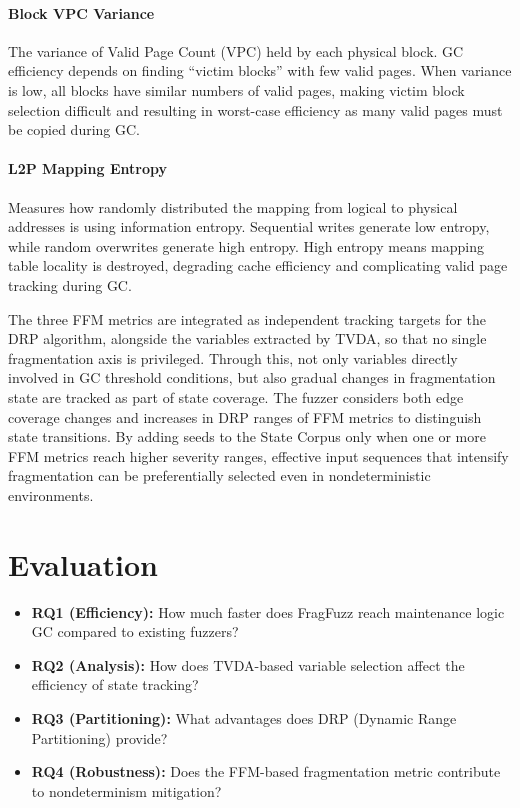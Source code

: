 \documentclass[conference]{IEEEtran}
\begin{document}
 \paragraph{Block VPC Variance}
The variance of Valid Page Count (VPC) held by each physical block.
GC efficiency depends on finding ``victim blocks'' with few valid pages.
When variance is low, all blocks have similar numbers of valid pages, making victim block selection difficult and resulting in worst-case efficiency as many valid pages must be copied during GC.
 \paragraph{L2P Mapping Entropy}
Measures how randomly distributed the mapping from logical to physical addresses is using information entropy.
Sequential writes generate low entropy, while random overwrites generate high entropy.
High entropy means mapping table locality is destroyed, degrading cache efficiency and complicating valid page tracking during GC.

The three FFM metrics are integrated as independent tracking targets for the DRP algorithm, alongside the variables extracted by TVDA, so that no single fragmentation axis is privileged.
Through this, not only variables directly involved in GC threshold conditions, but also gradual changes in fragmentation state are tracked as part of state coverage.
The fuzzer considers both edge coverage changes and increases in DRP ranges of FFM metrics to distinguish state transitions.
By adding seeds to the State Corpus only when one or more FFM metrics reach higher severity ranges, effective input sequences that intensify fragmentation can be preferentially selected even in nondeterministic environments.

\section{Evaluation}
\begin{itemize}
    \item \textbf{RQ1 (Efficiency):} How much faster does FragFuzz reach maintenance logic GC compared to existing fuzzers?
    \item \textbf{RQ2 (Analysis):} How does TVDA-based variable selection affect the efficiency of state tracking?
    \item \textbf{RQ3 (Partitioning):} What advantages does DRP (Dynamic Range Partitioning) provide?
    \item \textbf{RQ4 (Robustness):} Does the FFM-based fragmentation metric contribute to nondeterminism mitigation?
\end{itemize}
\end{document}
